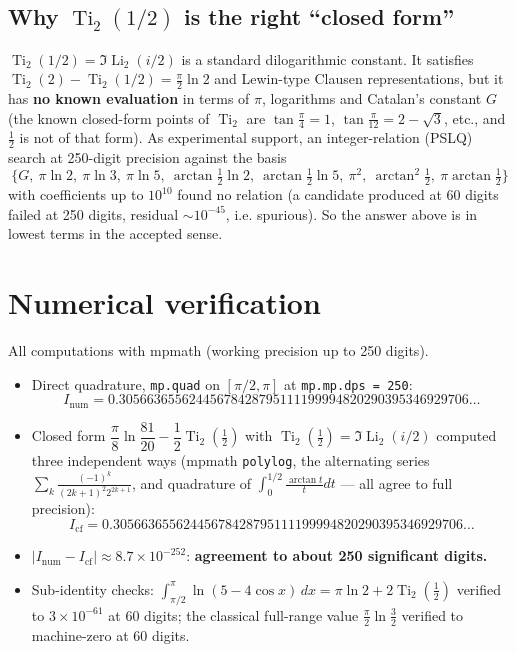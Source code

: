 \documentclass[11pt]{article}
\theoremstyle{remark}
\begin{document}
\subsection*{Why $\operatorname{Ti}_2(1/2)$ is the right ``closed form''}

$\operatorname{Ti}_2(1/2)=\Im\operatorname{Li}_2(i/2)$ is a standard dilogarithmic constant. It satisfies $\operatorname{Ti}_2(2)-\operatorname{Ti}_2(1/2)=\frac{\pi}{2}\ln 2$ and Lewin-type Clausen representations, but it has \textbf{no known evaluation} in terms of $\pi$, logarithms and Catalan's constant $G$ (the known closed-form points of $\operatorname{Ti}_2$ are $\tan\frac\pi4=1$, $\tan\frac{\pi}{12}=2-\sqrt3$, etc., and $\frac12$ is not of that form). As experimental support, an integer-relation (PSLQ) search at 250-digit precision against the basis
\[\{G,\ \pi\ln2,\ \pi\ln3,\ \pi\ln5,\ \arctan\tfrac12\ln2,\ \arctan\tfrac12\ln5,\ \pi^2,\ \arctan^2\tfrac12,\ \pi\arctan\tfrac12\}\]
with coefficients up to $10^{10}$ found no relation (a candidate produced at 60 digits failed at 250 digits, residual $\sim10^{-45}$, i.e. spurious). So the answer above is in lowest terms in the accepted sense.

\section*{Numerical verification}

All computations with mpmath (working precision up to 250 digits).

\begin{itemize}
\item Direct quadrature, \texttt{mp.quad} on $[\pi/2,\pi]$ at \texttt{mp.mp.dps = 250}:
  \[I_{\text{num}}=0.30566365562445678428795111199994820290395346929706\ldots\]
\item Closed form $\dfrac{\pi}{8}\ln\dfrac{81}{20}-\dfrac12\operatorname{Ti}_2(\tfrac12)$ with $\operatorname{Ti}_2(\tfrac12)=\Im\operatorname{Li}_2(i/2)$ computed three independent ways (mpmath \texttt{polylog}, the alternating series $\sum_k\frac{(-1)^k}{(2k+1)^2 2^{2k+1}}$, and quadrature of $\int_0^{1/2}\frac{\arctan t}{t}dt$ --- all agree to full precision):
  \[I_{\text{cf}}=0.30566365562445678428795111199994820290395346929706\ldots\]
\item $|I_{\text{num}}-I_{\text{cf}}|\approx 8.7\times10^{-252}$: \textbf{agreement to about 250 significant digits.}
\item Sub-identity checks: $\int_{\pi/2}^{\pi}\ln(5-4\cos x)\,dx=\pi\ln2+2\operatorname{Ti}_2(\tfrac12)$ verified to $3\times10^{-61}$ at 60 digits; the classical full-range value $\frac{\pi}{2}\ln\frac32$ verified to machine-zero at 60 digits.
\end{itemize}
\end{document}
